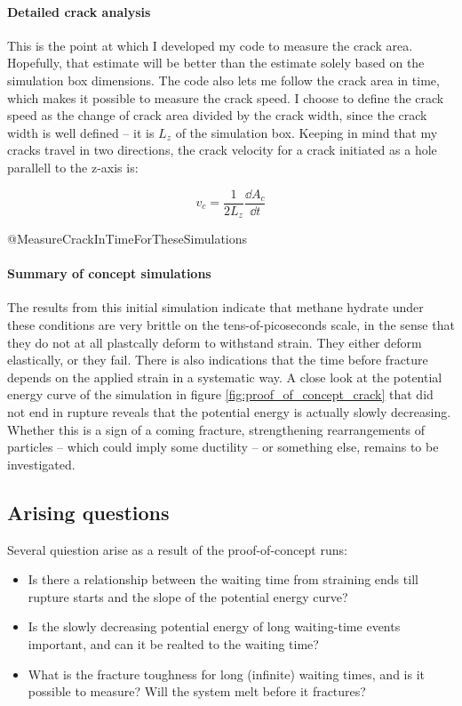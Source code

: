 \paragraph{Detailed crack analysis}
This is the point at which I developed my code to measure the crack area. Hopefully, that estimate will be better than the estimate solely based on the simulation box dimensions. The code also lets me follow the crack area in time, which makes it possible to measure the crack speed. I choose to define the crack speed as the change of crack area divided by the crack width, since the crack width is well defined – it is $L_z$ of the simulation box. Keeping in mind that my cracks travel in two directions, the crack velocity for a crack initiated as a hole parallell to the z-axis is:

\begin{equation}
v_c = \frac{1}{2L_z}\frac{\dd A_c}{\dd t}
\end{equation}

@MeasureCrackInTimeForTheseSimulations

\paragraph{Summary of concept simulations} The results from this initial simulation indicate that methane hydrate under these conditions are very brittle on the tens-of-picoseconds scale, in the sense that they do not at all plastcally deform to withstand strain. They either deform elastically, or they fail. There is also indications that the time before fracture depends on the applied strain in a systematic way. A close look at the potential energy curve of the simulation in figure \ref{fig:proof_of_concept_crack} that did not end in rupture reveals that the potential energy is actually slowly decreasing. Whether this is a sign of a coming fracture, strengthening rearrangements of particles -- which could imply some ductility -- or something else, remains to be investigated. 

\subsection{Arising questions}
Several quiestion arise as a result of the proof-of-concept runs:
\begin{itemize}
\item Is there a relationship between the waiting time from straining ends till rupture starts and the slope of the potential energy curve?
\item Is the slowly decreasing potential energy of long waiting-time events important, and can it be realted to the waiting time?
\item What is the fracture toughness for long (infinite) waiting times, and is it possible to measure? Will the system melt before it fractures?
\end{itemize}

